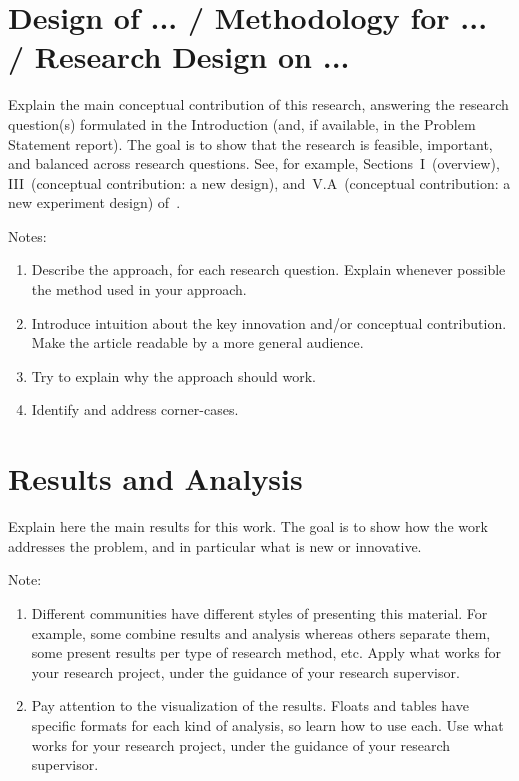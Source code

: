 \documentclass[11pt]{article}
\begin{document}
\section{Design of ... / Methodology for ... / Research Design on ...} \label{sec:research}

Explain the main conceptual contribution of this research, answering the research question(s) formulated in the Introduction (and, if available, in the Problem Statement report). The goal is to show that the research is feasible, important, and balanced across research questions. See, for example, Sections~I~(overview), III~(conceptual contribution: a new design), and~V.A~(conceptual contribution: a new experiment design) of~\cite{DBLP:conf/sc/AndreadisVMI18}.

Notes:
\begin{enumerate}
\item 
Describe the approach, for each research question. Explain whenever possible the method used in your approach. 

\item 
Introduce intuition about the key innovation and/or conceptual contribution. Make the article readable by a more general audience.

\item 
Try to explain why the approach should work. 

\item 
Identify and address corner-cases.

\end{enumerate}


\section{Results and Analysis} \label{sec:results}

Explain here the main results for this work. The goal is to show how the work addresses the problem, and in particular what is new or innovative.

Note:
\begin{enumerate}
    \item Different communities have different styles of presenting this material. For example, some combine results and analysis whereas others separate them, some present results per type of research method, etc. Apply what works for your research project, under the guidance of your research supervisor.
    
    \item Pay attention to the visualization of the results. Floats and tables have specific formats for each kind of analysis, so learn how to use each. Use what works for your research project, under the guidance of your research supervisor.
\end{enumerate}
\end{document}
